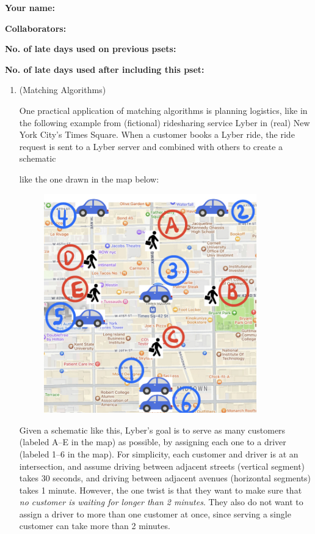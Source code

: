\documentclass[11pt]{article}
\begin{document}

\textbf{Your name: }

\textbf{Collaborators: }

\textbf{No. of late days used on previous psets: }

\textbf{No. of late days used after including this pset: }

\begin{enumerate}
 \item (Matching Algorithms) 

 One practical application of matching algorithms is planning logistics, like in the following example from (fictional) ridesharing service Lyber in (real) New York City's Times Square.  When a customer books a Lyber ride, the ride request is sent to a Lyber server and combined with others to create a schematic 

 like the one drawn in the map below:


\begin{figure}[H]
    \centering
    \includegraphics[width=0.87\textwidth]{NYC-map-zoomed-light.jpeg}
    \label{fig:travel_time_graph}
\end{figure}

Given a schematic like this, Lyber's goal is to serve as many customers (labeled A--E in the map) as possible, by assigning each one to a driver (labeled 1--6 in the map). For simplicity, each customer and driver is at an intersection, and assume driving between adjacent streets (vertical segment) takes 30 seconds, and driving between adjacent avenues (horizontal segments) takes 1 minute. However, the one twist is that they want to make sure that \textit{no customer is waiting for longer than 2 minutes}.  They also do not want to assign a driver to more than one customer at once, since serving a single customer can take more than 2 minutes.


\end{enumerate}
\end{document}
